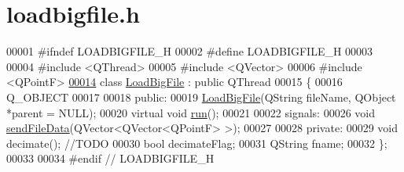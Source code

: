 \hypertarget{loadbigfile_8h_source}{}\section{loadbigfile.\+h}
\label{loadbigfile_8h_source}

\begin{DoxyCode}
00001 \textcolor{preprocessor}{#ifndef LOADBIGFILE\_H}
00002 \textcolor{preprocessor}{#define LOADBIGFILE\_H}
00003 
00004 \textcolor{preprocessor}{#include <QThread>}
00005 \textcolor{preprocessor}{#include <QVector>}
00006 \textcolor{preprocessor}{#include <QPointF>}
\hypertarget{loadbigfile_8h_source.tex_l00014}{}\hyperlink{classLoadBigFile}{00014} \textcolor{keyword}{class }\hyperlink{classLoadBigFile}{LoadBigFile} : \textcolor{keyword}{public} QThread
00015 \{
00016     Q\_OBJECT
00017 
00018 \textcolor{keyword}{public}:
00019     \hyperlink{classLoadBigFile_ad09a2464295530b5a7f202d7059e7e8a}{LoadBigFile}(QString fileName, QObject *parent = NULL);
00020     \textcolor{keyword}{virtual} \textcolor{keywordtype}{void} \hyperlink{classLoadBigFile_a8a1ceb823a23faa69485c864c35cd60f}{run}();
00021 
00022 signals:
00026     \textcolor{keywordtype}{void} \hyperlink{classLoadBigFile_ad0c00cd9faeeb4e03a94f530152c69d9}{sendFileData}(QVector<QVector<QPointF> >);
00027 
00028 \textcolor{keyword}{private}:
00029     \textcolor{keywordtype}{void} decimate(); \textcolor{comment}{//TODO}
00030     \textcolor{keywordtype}{bool} decimateFlag;
00031     QString fname;
00032 \};
00033 
00034 \textcolor{preprocessor}{#endif // LOADBIGFILE\_H}
\end{DoxyCode}
